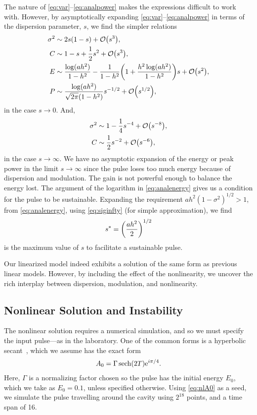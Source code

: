 \documentclass[9pt,twocolumn,twoside]{osajnl}
\let\originalleft\left
\let\originalright\right
\renewcommand{\left}{\mathopen{}\mathclose\bgroup\originalleft}
\renewcommand{\right}{\aftergroup\egroup\originalright}
\providecommand{\bigO}[1]{\ensuremath{\mathop{}\mathopen{}\mathcal{O}\mathopen{}\left(#1\right)}} %
\DeclareMathOperator{\sech}{sech}
\begin{document}
The nature of \eqref{eq:var}--\eqref{eq:analpower} makes the expressions difficult to work with. However, by asymptotically expanding \eqref{eq:var}--\eqref{eq:analpower} in terms of the dispersion parameter, $s$, we find the simpler relations
\begin{align}
	\sigma^2 &\sim 2s(1 - s) + \bigO{s^3}, \\
	C &\sim 1 - s + \frac{1}{2}s^2 + \bigO{s^3}, \\
	E &\sim \frac{\log (a h^2)}{1 - h^2} - \frac{1}{1 - h^2} \left( 1 + \frac{h^2 \log(a h^2)}{1 - h^2}  \right) s + \bigO{s^2}, \label{eq:maxenergy} \\
	P &\sim \frac{\log(ah^2)}{\sqrt{2 \pi}(1 - h^2)} s^{-1/2} + \bigO{s^{1/2}},
\end{align}
in the case $s \rightarrow 0$. And,
\begin{align}
	\sigma^2 &\sim 1 - \frac{1}{4}s^{-4} + \bigO{s^{-8}}, \label{eq:siginfty}\\
	C &\sim \frac{1}{2}s^{-2} + \bigO{s^{-6}},
\end{align}
in the case $s \rightarrow \infty$. We have no asymptotic expansion of the energy or peak power in the limit $s \rightarrow \infty$ since the pulse loses too much energy because of dispersion and modulation. The gain is not powerful enough to balance the energy lost. The argument of the logarithm in \eqref{eq:analenergy} gives us a condition for the pulse to be sustainable. Expanding the requirement $a h^2 (1 - \sigma^2)^{1/2} > 1$, from \eqref{eq:analenergy}, using \eqref{eq:siginfty} (for simple approximation), we find 
\begin{align}
	s^* = \left( \frac{a h^2}{2} \right)^{1/2}
\end{align}
is the maximum value of $s$ to facilitate a sustainable pulse.

Our linearized model indeed exhibits a solution of the same form as previous linear models. However, by including the effect of the nonlinearity, we uncover the rich interplay between dispersion, modulation, and nonlinearity.

\subsection{Nonlinear Solution and Instability}
\label{sec:nlresults}
The nonlinear solution requires a numerical simulation, and so we must specify the input pulse---as in the laboratory. One of the common forms is a hyperbolic secant~\cite{coen1997, finot2008, rothenberg1989b, tomlinson1984}, which we assume has the exact form
\begin{align}
	A_0 = \Gamma \sech \left( 2 T \right) \textrm{e}^{i \pi / 4}.
	\label{eq:nlA0}
\end{align}
Here, $\Gamma$ is a normalizing factor chosen so the pulse has the initial energy $E_0$, which we take as $E_0 = 0.1$, unless specified otherwise. Using \eqref{eq:nlA0} as a seed, we simulate the pulse travelling around the cavity using $2^{18}$ points, and a time span of 16.
\end{document}
